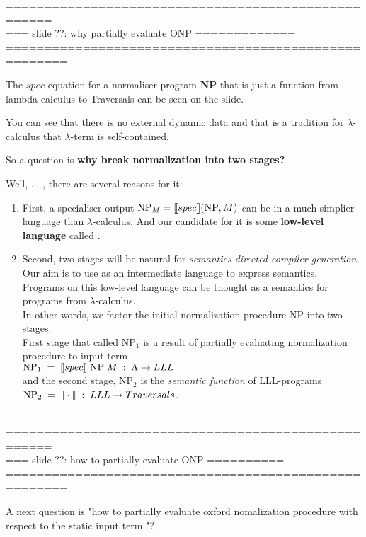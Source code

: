 \documentclass[a4paper, 10pt]{article} %
\newcommand{\be}{\begin{enumerate}}
\newcommand{\ee}{\end{enumerate}}
\newcommand{\ii}{\item}
\newcommand{\red}[1]{{\color{red}#1}}
\newcommand{\green}[1]{{\color{blue!20!black!30!green}#1}}
\newcommand{\blue}[1]{{\color{blue}#1}}
\newcommand{\brown}[1]{{\color{brown}#1}}
\newcommand{\lam}[1]{{\color{brown}\textit{\boldmath{#1}}}}
\newcommand{\lsem}{\mbox{$\lbrack\hspace{-0.3ex}\lbrack$}}
\newcommand{\rsem}{\mbox{$\rbrack\hspace{-0.3ex}\rbrack$}}
\begin{document}
====================================================\\
=== slide ??: why partially evaluate ONP =============\\
======================================================

The $spec$ equation for a normaliser program \textbf{NP} that is just a function from lambda-calculus to Traversals can be seen on the slide.

You can see that there is no external dynamic
data and that is a tradition for $\lambda$-calculus that $\lambda$-term \lam{M} is self-contained.

So a question is \textbf{why break normalization into two stages?}

Well, ... , there are several reasons for it:
\be
\ii First, a specialiser output $\mbox{NP}_M = \lsem spec \rsem (\mbox{NP}, M)$
  can be in a \blue{much simplier language} than $\lambda$-calculus.
  And our candidate for it is some \textbf{\brown{low-level language}} called \lam{LLL}.

\ii Second, two stages will be natural for \blue{\em semantics-directed compiler generation}.\\
  Our \green{aim is to use \lam{LLL} as an intermediate language to express \red{semantics}}.\\
  Programs on this low-level language can be thought as a \red{semantics}
  for programs from $\lambda$-calculus.\\
  In other words, we \red{factor} the initial normalization procedure $\mbox{NP}$ into two stages:\\
  First stage that called $\mbox{NP}_1$ is a result of partially evaluating 
  normalization procedure to input term \lam{$M$}\\
  $\mbox{NP}_1\;=\; \lsem spec \rsem\; \mbox{NP}\; M\;:\; \Lambda \rightarrow LLL$\\
  and the second stage, $\mbox{NP}_2$ is the \textit{semantic function} of LLL-programs\\
  $\mbox{NP}_2\;=\; \lsem \cdot \rsem\; :\; LLL \rightarrow Traversals$.
\ee
\ \\



====================================================\\
=== slide ??: how to partially evaluate ONP ==========\\
======================================================

A next question is "how to partially evaluate oxford nomalization procedure
with respect to the \red{static} input term \lam{$M$}"?
\end{document}
